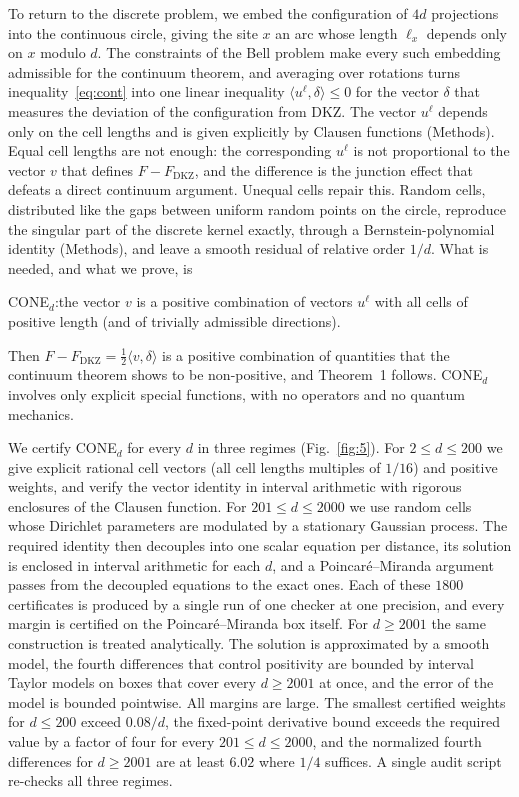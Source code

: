 \documentclass[11pt]{article}
\newcommand{\FD}{F_{\mathrm{DKZ}}}
\begin{document}
To return to the discrete problem, we embed the configuration of $4d$ projections into the continuous circle, giving the
site $x$ an arc whose length $\ell_x$ depends only on $x$ modulo $d$. The constraints of the Bell problem make every
such embedding admissible for the continuum theorem, and averaging over rotations turns
inequality~\eqref{eq:cont} into one linear inequality $\langle u^\ell,\delta\rangle\le0$ for the vector $\delta$ that
measures the deviation of the configuration from DKZ. The vector $u^\ell$ depends only on the cell lengths and is
given explicitly by Clausen functions (Methods). Equal cell lengths are not enough: the corresponding $u^\ell$ is not
proportional to the vector $v$ that defines $F-\FD$, and the difference is the junction effect that defeats a direct
continuum argument. Unequal cells repair this. Random cells, distributed like the gaps between uniform random
points on the circle, reproduce the singular part of the discrete kernel exactly, through a Bernstein-polynomial
identity (Methods), and leave a smooth residual of relative order $1/d$. What is needed, and what we prove, is
\begin{center}
CONE$_d$:\quad the vector $v$ is a positive combination of vectors $u^\ell$ with all cells of positive length
(and of trivially admissible directions).
\end{center}
Then $F-\FD=\frac12\langle v,\delta\rangle$ is a positive combination of quantities that the continuum theorem shows to
be non-positive, and Theorem~1 follows. CONE$_d$ involves only explicit special functions, with no operators and no
quantum mechanics.

We certify CONE$_d$ for every $d$ in three regimes (Fig.~\ref{fig:5}). For $2\le d\le200$ we give explicit rational
cell vectors (all cell lengths multiples of $1/16$) and positive weights, and verify the vector identity in interval
arithmetic with rigorous enclosures of the Clausen function. For $201\le d\le2000$ we use random cells whose Dirichlet
parameters are modulated by a stationary Gaussian process. The required identity then decouples into one scalar
equation per distance, its solution is enclosed in interval arithmetic for each $d$, and a Poincar\'e--Miranda
argument\cite{Kulpa1997} passes from the decoupled equations to the exact ones. Each of these $1800$ certificates is
produced by a single run of one checker at one precision, and every margin is certified on the Poincar\'e--Miranda box
itself. For $d\ge2001$ the same construction is treated analytically. The solution is approximated by a smooth model,
the fourth differences that control positivity are bounded by interval Taylor models on boxes that cover every
$d\ge2001$ at once, and the error of the model is bounded pointwise. All margins are large. The smallest certified
weights for $d\le200$ exceed $0.08/d$, the fixed-point derivative bound exceeds the required value by a factor of four
for every $201\le d\le2000$, and the normalized fourth differences for $d\ge2001$ are at least $6.02$ where $1/4$
suffices. A single audit script re-checks all three regimes.
\end{document}
